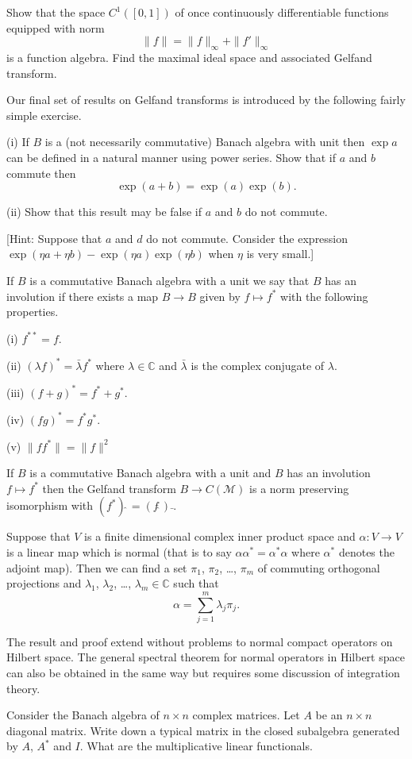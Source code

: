 \begin{exercise} Show that the space $C^{1}([0,1])$
of once
continuously differentiable functions equipped
with norm 
\[\|f\|=\|f\|_{\infty}+\|f'\|_{\infty}\]
is a function algebra. 
Find the maximal ideal
space and associated Gelfand transform.
\end{exercise}
Our final set of results on Gelfand transforms is introduced by the 
following fairly simple exercise.
\begin{added}[Exercise] (i) If $B$ is a (not necessarily commutative) 
Banach algebra with unit
then $\exp a$ can be defined in a natural manner using power series.
Show that if $a$ and $b$ commute then
\[\exp(a+b)=\exp(a)\exp(b).\]

(ii) Show that this result may be false if $a$ and $b$ do not commute.

[Hint: Suppose that $a$ and $d$ do not commute. Consider
the expression
$\exp(\eta a+\eta b)-\exp(\eta a)\exp(\eta b)$ when $\eta$ is very
small.]
\end{added}
\begin{added}[Definition] If $B$ is a commutative Banach algebra
with a unit we say that $B$ has an involution if there
exists a map $B\rightarrow B$ given by $f\mapsto f^{*}$
with the following properties.

(i) $f^{**}=f$.

(ii) $(\lambda f)^{*}=\bar{\lambda}f^{*}$ where $\lambda\in{\mathbb C}$
and $\bar{\lambda}$ is the complex conjugate of $\lambda$.

(iii) $(f+g)^{*}=f^{*}+g^{*}$.

(iv) $(fg)^{*}=f^{*}g^{*}$.

(v) $\|ff^{*}\|=\|f\|^{2}$
\end{added}
\begin{added}[Theorem] If $B$ is a commutative Banach algebra
with a unit and $B$ has an involution   $f\mapsto f^{*}$
then the Gelfand transform $B\rightarrow C({\mathcal M})$
is a norm preserving isomorphism with $(f^{*})\hat{\ }=(f\hat{\ })\bar{\ }$.
\end{added}
\begin{added}[Corollary] Suppose that $V$ is a finite dimensional
complex inner product space and
$\alpha:V\rightarrow V$
is a linear map which is normal 
(that is to say $\alpha\alpha^{*}=\alpha^{*}\alpha$
where $\alpha^{*}$ denotes the adjoint map). Then we can
find a set $\pi_{1}$, $\pi_{2}$, \dots, $\pi_{m}$
of commuting orthogonal projections and $\lambda_{1}$, $\lambda_{2}$,
\dots, $\lambda_{m}\in{\mathbb C}$ such that
\[\alpha=\sum_{j=1}^{m}\lambda_{j}\pi_{j}.\]
\end{added}
The result and proof extend without problems to
normal compact operators on Hilbert space.
The general
spectral theorem for normal operators in Hilbert space
can also be obtained in the same way but requires some discussion
of integration theory.
\begin{added}[Exercise] Consider the Banach algebra of $n\times n$
complex matrices. 
Let $A$ be an $n\times n$ diagonal matrix.
Write down a typical matrix in the closed subalgebra generated
by $A$, $A^{*}$ and $I$. What are the multiplicative linear functionals.
\end{added}
